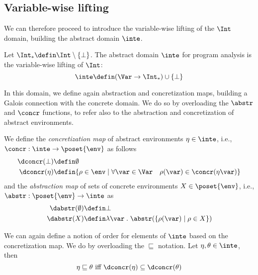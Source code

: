 \subsection{Variable-wise lifting}\label{sub:vwintervals}

We can therefore proceed to introduce the variable-wise lifting of the
\(\Int\) domain, building the abstract domain \(\inte\).

\begin{definition}
  Let \(\Int_* \defin \Int \setminus \{\bot\}\). The abstract domain
  \(\inte\) for program analysis is the variable-wise lifting of
  \(\Int\):
  \[ \inte \defin (\Var \to \Int_*) \cup \{ \bot \} \]
\end{definition}

In this domain, we define again abstraction and concretization maps,
building a Galois connection with the concrete domain. We do so by
overloading the \(\abstr\) and \(\concr\) functions, to refer also to
the abstraction and concretization of abstract environments.

\begin{definition}\label{def:vwabstr}
  We define the \emph{concretization map} of abstract environments
  \(\eta \in \inte\), i.e., \(\concr : \inte \to \poset{\env}\) as
  follows
  \begin{align*}
    \dconcr(\bot) & \defin \emptyset \\
    \dconcr(\eta) & \defin \{\rho \in \env \mid \forall \var \in \Var \quad \rho(\var) \in \concr(\eta\var)\}
  \end{align*}
  and the \emph{abstraction map} of sets of concrete environments
  \(X \in \poset{\env}\), i.e., \(\abstr : \poset{\env} \to \inte\) as
  \begin{align*}
    \dabstr(\emptyset) & \defin \bot \\
    \dabstr(X) & \defin \lambda \var \; . \; \abstr(\{\rho(\var) \mid \rho \in X\})
  \end{align*}
\end{definition}

We can again define a notion of order for elements of \(\inte\) based
on the concretization map. We do by overloading the 
\(\sqsubseteq\) notation. Let \(\eta, \theta \in \inte\), then
\begin{equation*}
  \eta \sqsubseteq \theta \text{ iff } \dconcr(\eta) \subseteq \dconcr(\theta)
\end{equation*}

